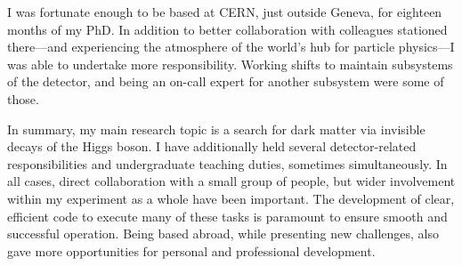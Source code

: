 \begin{cvparagraph}
    I was fortunate enough to be based at CERN, just outside Geneva, for eighteen months of my PhD. In addition to better collaboration with colleagues stationed there---and experiencing the atmosphere of the world's hub for particle physics---I was able to undertake more responsibility. Working shifts to maintain subsystems of the detector, and being an on-call expert for another subsystem were some of those.

    In summary, my main research topic is a search for dark matter via invisible decays of the Higgs boson. I have additionally held several detector-related responsibilities and undergraduate teaching duties, sometimes simultaneously. In all cases, direct collaboration with a small group of people, but wider involvement within my experiment as a whole have been important. The development of clear, efficient code to execute many of these tasks is paramount to ensure smooth and successful operation. Being based abroad, while presenting new challenges, also gave more opportunities for personal and professional development.


\end{cvparagraph}

